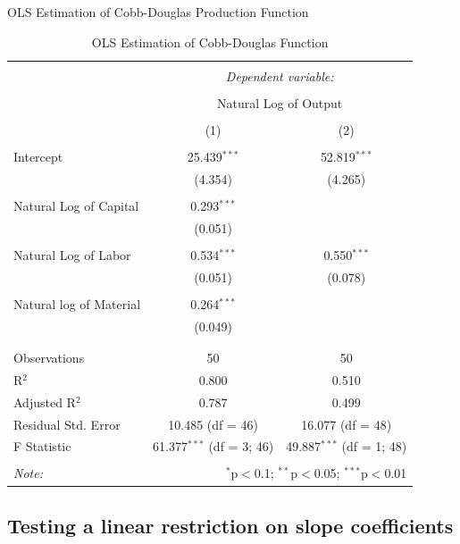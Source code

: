 \documentclass[
]{book}
\theoremstyle{definition}
\theoremstyle{definition}
\theoremstyle{definition}
\theoremstyle{definition}
\theoremstyle{remark}
\begin{document}
\label{tab:ch4table3} OLS Estimation of Cobb-Douglas Production Function

\begin{table}[!htbp] \centering 
  \caption{OLS Estimation of Cobb-Douglas Function} 
  \label{} 
\begin{tabular}{@{\extracolsep{5pt}}lcc} 
\\[-1.8ex]\hline 
\hline \\[-1.8ex] 
 & \multicolumn{2}{c}{\textit{Dependent variable:}} \\ 
\cline{2-3} 
\\[-1.8ex] & \multicolumn{2}{c}{Natural Log of Output} \\ 
\\[-1.8ex] & (1) & (2)\\ 
\hline \\[-1.8ex] 
 Intercept & 25.439$^{***}$ & 52.819$^{***}$ \\ 
  & (4.354) & (4.265) \\ 
  & & \\ 
 Natural Log of Capital & 0.293$^{***}$ &  \\ 
  & (0.051) &  \\ 
  & & \\ 
 Natural Log of Labor & 0.534$^{***}$ & 0.550$^{***}$ \\ 
  & (0.051) & (0.078) \\ 
  & & \\ 
 Natural log of Material & 0.264$^{***}$ &  \\ 
  & (0.049) &  \\ 
  & & \\ 
\hline \\[-1.8ex] 
Observations & 50 & 50 \\ 
R$^{2}$ & 0.800 & 0.510 \\ 
Adjusted R$^{2}$ & 0.787 & 0.499 \\ 
Residual Std. Error & 10.485 (df = 46) & 16.077 (df = 48) \\ 
F Statistic & 61.377$^{***}$ (df = 3; 46) & 49.887$^{***}$ (df = 1; 48) \\ 
\hline 
\hline \\[-1.8ex] 
\textit{Note:}  & \multicolumn{2}{r}{$^{*}$p$<$0.1; $^{**}$p$<$0.05; $^{***}$p$<$0.01} \\ 
\end{tabular} 
\end{table}

\hypertarget{testing-a-linear-restriction-on-slope-coefficients}{%
\subsection{Testing a linear restriction on slope coefficients}\label{testing-a-linear-restriction-on-slope-coefficients}}
\end{document}
